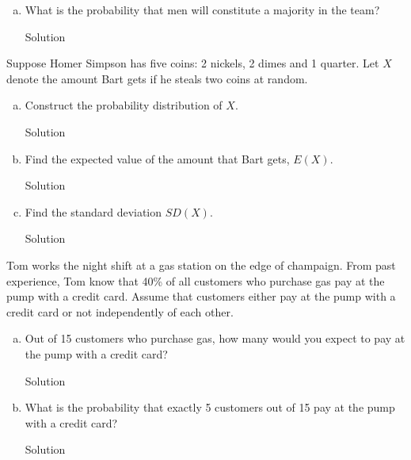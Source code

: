 \documentclass{article}
\begin{document}
\begin{spacing}{1.1}
\begin{homeworkProblem}
\begin{enumerate}[(a)]
\begin{homeworkSection}{Solution}
			\end{homeworkSection}
		\item What is the probability that men will constitute a majority in the team?
			\begin{homeworkSection}{Solution}
		
			\end{homeworkSection}			
	\end{enumerate}
\end{homeworkProblem}
\begin{homeworkProblem}
	Suppose Homer Simpson has five coins: 2 nickels, 2 dimes and 1 quarter.  Let $X$ denote the amount Bart gets if he steals two coins at random.  
	\begin{enumerate}[(a)]
		\item  Construct the probability distribution of $X$.
			\begin{homeworkSection}{Solution}
		
			\end{homeworkSection}
		\item  Find the expected value of the amount that Bart gets, $E(X)$.
			\begin{homeworkSection}{Solution}
		
			\end{homeworkSection}
		\item  Find the standard deviation $SD(X)$.
			\begin{homeworkSection}{Solution}
		
			\end{homeworkSection}
	\end{enumerate}
\end{homeworkProblem}
\begin{homeworkProblem}
	Tom works the night shift at a gas station on the edge of champaign.  From past experience, Tom know that 40\% of all customers who purchase gas pay at the pump with a credit card.  Assume that customers either pay at the pump with a credit card or not independently of each other. 
	\begin{enumerate}[(a)]
		\item Out of 15 customers who purchase gas, how many would you expect to pay at the pump with a credit card?
			\begin{homeworkSection}{Solution}
		
			\end{homeworkSection}
		\item What is the probability that exactly 5 customers out of 15 pay at the pump with a credit card?
			\begin{homeworkSection}{Solution}
		

\end{homeworkSection}
\end{enumerate}
\end{homeworkProblem}
\end{spacing}
\end{document}
